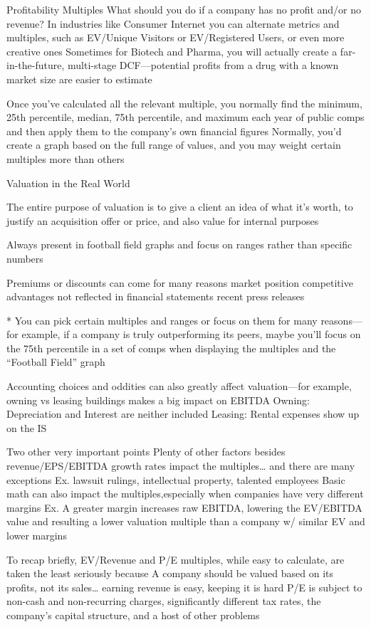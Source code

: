 \documentclass[10pt]{article}
\begin{document}
\begin{core}{Profitability Multiples}
      What should you do if a company has no profit and/or no revenue?
        In industries like Consumer Internet you can alternate metrics and multiples, such as EV/Unique Visitors or EV/Registered Users, or even more creative ones
        Sometimes for Biotech and Pharma, you will actually create a far-in-the-future, multi-stage DCF—potential profits from a drug with a known market size are easier to estimate

      Once you’ve calculated all the relevant multiple, you normally find the minimum, 25th percentile, median, 75th percentile, and maximum each year of public comps and then apply them to the company’s own financial figures
      Normally, you’d create a graph based on the full range of values, and you may weight certain multiples more than others

    \end{core}

    \begin{core}{Valuation in the Real World}

      The entire purpose of valuation is to give a client an idea of what it’s worth, to justify an acquisition offer or price, and also value for internal purposes

      Always present in football field graphs and focus on ranges rather than specific numbers

      Premiums or discounts can come for many reasons
        market position
        competitive advantages not reflected in financial statements
        recent press releases

      * You can pick certain multiples and ranges or focus on them for many reasons—for example, if a company is truly outperforming its peers, maybe you’ll focus on the 75th percentile in a set of comps when displaying the multiples and the “Football Field” graph

      Accounting choices and oddities can also greatly affect valuation—for example, owning vs leasing buildings makes a big impact on EBITDA
        Owning: Depreciation and Interest are neither included
        Leasing: Rental expenses show up on the IS

      Two other very important points
        Plenty of other factors besides revenue/EPS/EBITDA growth rates impact the multiples… and there are many exceptions
          Ex. lawsuit rulings, intellectual property, talented employees
        Basic math can also impact the multiples,especially when companies have very different margins
          Ex. A greater margin increases raw EBITDA, lowering the EV/EBITDA value and resulting a lower valuation multiple than a company w/ similar EV and lower margins

      To recap briefly, EV/Revenue and P/E multiples, while easy to calculate, are taken the least seriously because
        A company should be valued based on its profits, not its sales… earning revenue is easy, keeping it is hard
        P/E is subject to non-cash and non-recurring charges, significantly different tax rates, the company’s capital structure, and a host of other problems

    \end{core}
\end{document}

